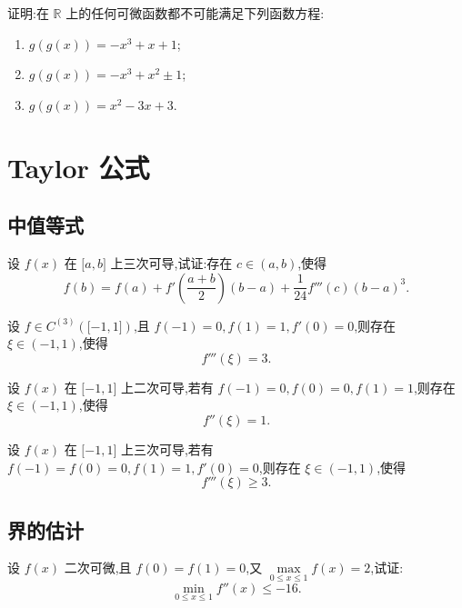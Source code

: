 \documentclass[../数学分析培优讲义.tex]{subfiles}
\begin{document}
\begin{example}
证明:在 $\mathbb{R}$ 上的任何可微函数都不可能满足下列函数方程:
\begin{enumerate}[label=(\arabic*)]
    \item $g(g(x))=-x^3+x+1$;
    \item $g(g(x))=-x^3+x^2\pm1$;
    \item $g(g(x))=x^2-3x+3$.
\end{enumerate}
\end{example}
\exampleblank


\newpage

\section{Taylor 公式}


\subsection{中值等式}

\begin{example}
设 $f(x)$ 在 $\lbrack a,b\rbrack$ 上三次可导,试证:存在 $c\in(a,b)$,使得
\[
    f(b)=f(a)+f'\left(\dfrac{a+b}{2}\right)(b-a)
    +\dfrac{1}{24}f'''(c)(b-a)^3.
\]
\end{example}
\exampleblank

\begin{example}
设 $f\in C^{(3)}(\lbrack -1,1\rbrack)$,且 $f(-1)=0,f(1)=1,f'(0)=0$,则存在 $\xi\in(-1,1)$,使得
\[
    f'''(\xi)=3.
\]
\end{example}
\exampleblank

\begin{example}
设 $f(x)$ 在 $\lbrack -1,1\rbrack$ 上二次可导,若有 $f(-1)=0,f(0)=0,f(1)=1$,则存在 $\xi\in(-1,1)$,使得
\[
    f''(\xi)=1.
\]
\end{example}
\exampleblank

\begin{example}
设 $f(x)$ 在 $\lbrack -1,1\rbrack$ 上三次可导,若有 $f(-1)=f(0)=0,f(1)=1,f'(0)=0$,则存在 $\xi\in(-1,1)$,使得
\[
    f'''(\xi)\geq 3.
\]
\end{example}
\exampleblank


\newpage

\subsection{界的估计}

\begin{example}
设 $f(x)$ 二次可微,且 $f(0)=f(1)=0$,又
$\displaystyle\max\limits_{0\leq x\leq1}f(x)=2$,试证:
\[
    \min\limits_{0\leq x\leq1}f''(x)\leq-16.
\]
\end{example}
\exampleblank
\end{document}

